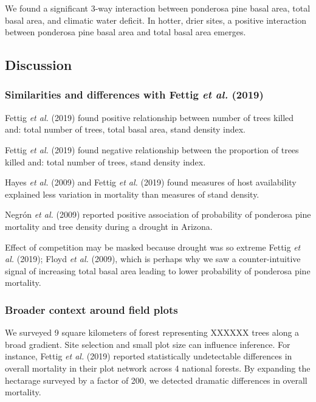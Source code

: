 \documentclass[]{article}
\begin{document}
We found a significant 3-way interaction between ponderosa pine basal
area, total basal area, and climatic water deficit. In hotter, drier
sites, a positive interaction between ponderosa pine basal area and
total basal area emerges.

\subsection{Discussion}\label{discussion}

\subsubsection{\texorpdfstring{Similarities and differences with Fettig
\emph{et al.}
(2019)}{Similarities and differences with Fettig et al. (2019)}}\label{similarities-and-differences-with-fettig2019}

Fettig \emph{et al.} (2019) found positive relationship between number
of trees killed and: total number of trees, total basal area, stand
density index.

Fettig \emph{et al.} (2019) found negative relationship between the
proportion of trees killed and: total number of trees, stand density
index.

Hayes \emph{et al.} (2009) and Fettig \emph{et al.} (2019) found
measures of host availability explained less variation in mortality than
measures of stand density.

Negrón \emph{et al.} (2009) reported positive association of probability
of ponderosa pine mortality and tree density during a drought in
Arizona.

Effect of competition may be masked because drought was so extreme
Fettig \emph{et al.} (2019); Floyd \emph{et al.} (2009), which is
perhaps why we saw a counter-intuitive signal of increasing total basal
area leading to lower probability of ponderosa pine mortality.

\subsubsection{Broader context around field
plots}\label{broader-context-around-field-plots}

We surveyed 9 square kilometers of forest representing XXXXXX trees
along a broad gradient. Site selection and small plot size can influence
inference. For instance, Fettig \emph{et al.} (2019) reported
statistically undetectable differences in overall mortality in their
plot network across 4 national forests. By expanding the hectarage
surveyed by a factor of 200, we detected dramatic differences in overall
mortality.
\end{document}
